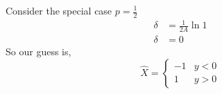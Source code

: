 \documentclass[journal, 12pt, twocolumn]{IEEEtran}
\begin{document}
\begin{enumerate}[label=\arabic{section}.\arabic*]
        Consider the special case $p=\frac{1}{2}$
        \begin{align}
            \delta &= \frac{1}{2 A} \ln 1 \\
            \delta &= 0
        \end{align}
        So our guess is,
        \begin{equation}
            \hat{X} = \begin{cases}
                -1 & y < 0 \\
                1 & y > 0
            \end{cases}
        \end{equation}

\end{enumerate}
\end{document}
